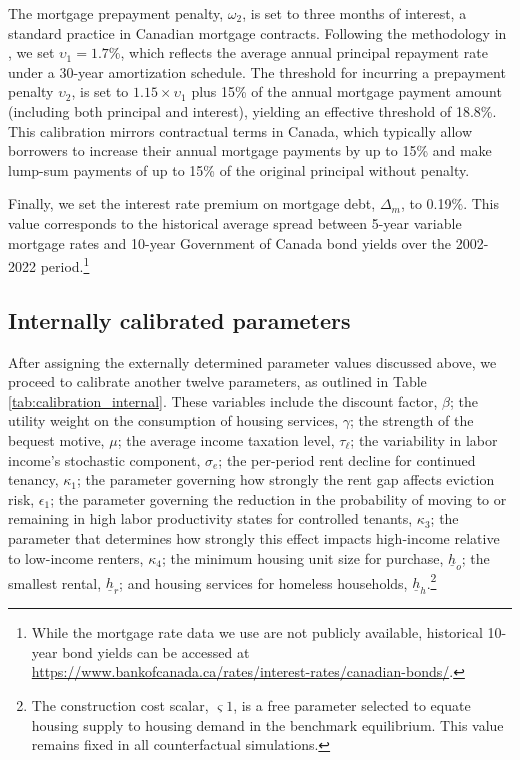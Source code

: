 \documentclass[parskip=full]{article}
\begin{document}
The mortgage prepayment penalty, $\omega_{2}$, is set to three months of interest, a standard practice in Canadian mortgage contracts. Following the methodology in \citet{kkk-2021}, we set $\upsilon_{1}=1.7\%$, which reflects the average annual principal repayment rate under a 30-year amortization schedule. The threshold for incurring a prepayment penalty $\upsilon_{2}$, is set to $1.15 \times \upsilon_{1}$ plus 15\% of the annual mortgage payment amount (including both principal and interest), yielding an effective threshold of 18.8\%. This calibration mirrors contractual terms in Canada, which typically allow borrowers to increase their annual mortgage payments by up to 15\% and make lump-sum payments of up to 15\% of the original principal without penalty.

Finally, we set the interest rate premium on mortgage debt, $\Delta_{m}$, to 0.19\%. This value corresponds to the historical average spread between 5-year variable mortgage rates and 10-year Government of Canada bond yields over the 2002-2022 period.\footnote{While the mortgage rate data we use are not publicly available, historical 10-year bond yields can be accessed at \url{https://www.bankofcanada.ca/rates/interest-rates/canadian-bonds/}.}

\subsection{Internally calibrated parameters}

After assigning the externally determined parameter values discussed above, we proceed to calibrate another twelve parameters, as outlined in Table \ref{tab:calibration_internal}. These variables include the discount factor, $\beta$; the utility weight on the consumption of housing services, $\gamma$; the strength of the bequest motive, $\mu$; the average income taxation level, $\tau_{\ell}$; the variability in labor income's stochastic component, $\sigma_{e}$; the per-period rent decline for continued tenancy, $\kappa_1$; the parameter governing how strongly the rent gap affects eviction risk, $\epsilon_1$; the parameter governing the reduction in the probability of moving to or remaining in high labor productivity states for controlled tenants, $\kappa_3$; the parameter that determines how strongly this effect impacts high-income relative to low-income renters, $\kappa_4$; the minimum housing unit size for purchase, $\underline{h}_{o}$; the smallest rental, $\underline{h}_{r}$; and housing services for homeless households, $\underline{h}_{h}$.\footnote{The construction cost scalar, $\varsigma{1}$, is a free parameter selected to equate housing supply to housing demand in the benchmark equilibrium. This value remains fixed in all counterfactual simulations.}
\end{document}
